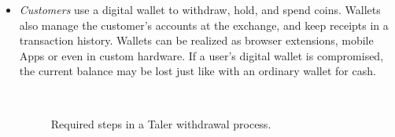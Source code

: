 \documentclass{llncs}
\begin{document}
\begin{itemize}
\item
{\em Customers} use a digital wallet to withdraw,
hold, and spend coins. Wallets also manage the customer's accounts
at the exchange, and keep receipts in a transaction history.  Wallets can be
realized as browser extensions, mobile Apps or even in custom
hardware.  If a user's digital wallet is compromised, the current
balance may be lost just like with an ordinary wallet for cash.


\begin{figure}[t!]%
 \hfill
{} \\
 \hfill
{}
\caption{Required steps in a Taler withdrawal process.}
\label{fig:withdrawal}
\end{figure}




\end{itemize}
\end{document}
